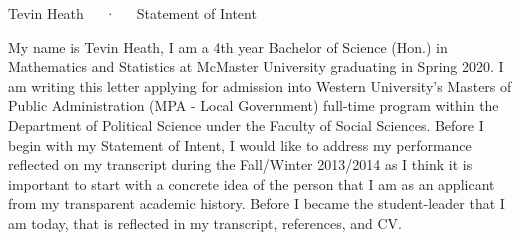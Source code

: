 \documentclass[11pt, a4paper]{awesome-cv}
\begin{document}
\makecvheader[C]

\makecvfooter
  {}
  {Tevin Heath~~~·~~~Statement of Intent}
  {\thepage}

\makelettertitle

\begin{cvletter}
\setlength\parindent{24pt}


My name is Tevin Heath, I am a 4th year Bachelor of Science (Hon.) in Mathematics and Statistics at McMaster University graduating in Spring 2020. I am writing this letter applying for admission into Western University’s Masters of Public Administration (MPA - Local Government) full-time program within the Department of Political Science under the Faculty of Social Sciences. Before I begin with my Statement of Intent, I would like to address my performance reflected on my transcript during the Fall/Winter 2013/2014 as I think it is important to start with a concrete idea of the person that I am as an applicant from my transparent academic history. Before I became the student-leader that I am today, that is reflected in my transcript, references, and CV. 



\end{cvletter}
\end{document}
